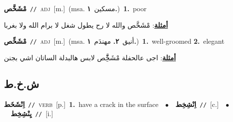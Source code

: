 \documentclass[10pt,a4paper,twoside]{article} %
\begin{document}
\begin{multicols}{2}
{\setlength\topsep{0pt}\textbf{\foreignlanguage{arabic}{مْشَخَّص}}\ {\color{gray}\texttt{//}\color{black}}\ \textsc{adj}\ [m.]\ \color{gray}(msa. \foreignlanguage{arabic}{مسكين}~\foreignlanguage{arabic}{\textbf{١.}})\color{black}\ \textbf{1.}~poor\  \begin{flushright}\color{gray}\foreignlanguage{arabic}{\textbf{\underline{\foreignlanguage{arabic}{أمثلة}}}: مْشَخَّص والله لا رح يطول شغل لا برام الله ولا بغربا}\end{flushright}\color{black}} \vspace{2mm}

{\setlength\topsep{0pt}\textbf{\foreignlanguage{arabic}{مْشَخِّص}}\ {\color{gray}\texttt{//}\color{black}}\ \textsc{adj}\ [m.]\ \color{gray}(msa. \foreignlanguage{arabic}{أنيق}~\foreignlanguage{arabic}{\textbf{٢.}}  \foreignlanguage{arabic}{مهندَم}~\foreignlanguage{arabic}{\textbf{١.}})\color{black}\ \textbf{1.}~well-groomed  \textbf{2.}~elegant\  \begin{flushright}\color{gray}\foreignlanguage{arabic}{\textbf{\underline{\foreignlanguage{arabic}{أمثلة}}}: اجى عالحفلة مْشَخَِّّص لابس هالبدلة الساتان اشي بجنن}\end{flushright}\color{black}} \vspace{2mm}

\vspace{-3mm}
\subsection*{\color{blue}\foreignlanguage{arabic}{ش.خ.ط}\color{blue}{}} 

{\setlength\topsep{0pt}\textbf{\foreignlanguage{arabic}{اِنْشَخَط}}\ {\color{gray}\texttt{//}\color{black}}\ \textsc{verb}\ [p.]\ \textbf{1.}~have a crack in the surface\ \ $\bullet$\ \ \setlength\topsep{0pt}\textbf{\foreignlanguage{arabic}{اِنْشِخِط}}\ {\color{gray}\texttt{//}\color{black}}\ [c.]\ \ $\bullet$\ \ \setlength\topsep{0pt}\textbf{\foreignlanguage{arabic}{يِنْشِخِط}}\ {\color{gray}\texttt{//}\color{black}}\ [i.]\ } \vspace{2mm}


\end{multicols}
\end{document}

